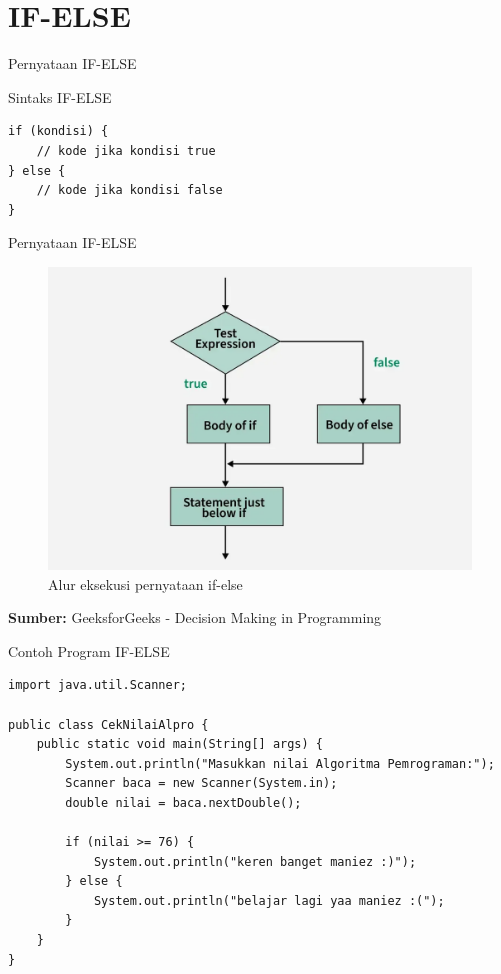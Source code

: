 \documentclass{beamer}
\begin{document}
\section{IF-ELSE}
\begin{frame}[fragile]{Pernyataan IF-ELSE}
  \begin{block}{Sintaks IF-ELSE}
    \begin{lstlisting}
if (kondisi) {
    // kode jika kondisi true
} else {
    // kode jika kondisi false
}
    \end{lstlisting}
  \end{block}
\end{frame}

\begin{frame}{Pernyataan IF-ELSE}
    \begin{figure}[h]
    \centering
    \includegraphics[width=0.5\linewidth]{Struktur Kontrol 1/if-else-flowchart.png}
    \caption{Alur eksekusi pernyataan if-else}
    \label{fig:if-else-flow}
  \end{figure}
  \textbf{Sumber: }GeeksforGeeks - Decision Making in Programming
\end{frame}

\begin{frame}[fragile]{Contoh Program IF-ELSE}
\begin{lstlisting}
import java.util.Scanner;

public class CekNilaiAlpro {
    public static void main(String[] args) {
        System.out.println("Masukkan nilai Algoritma Pemrograman:");
        Scanner baca = new Scanner(System.in);
        double nilai = baca.nextDouble();
        
        if (nilai >= 76) {
            System.out.println("keren banget maniez :)");
        } else {
            System.out.println("belajar lagi yaa maniez :(");
        }
    }
}
\end{lstlisting}
\end{frame}
\end{document}
